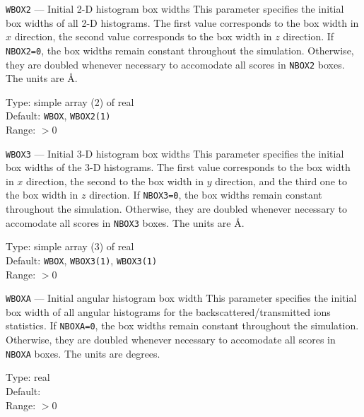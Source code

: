 \begin{keydescription}{\texttt{WBOX2} --- Initial 2-D histogram box widths}
%
  This parameter specifies the initial box widths of all 2-D histograms. The first value 
  corresponds to the box width in $x$ direction, the second value corresponds to the box width 
  in $z$ direction. If \texttt{NBOX2=0}, the box widths remain constant
  throughout the simulation. Otherwise, they are doubled whenever necessary
  to accomodate all scores in \texttt{NBOX2} boxes. The units are \AA.  
  \begin{keytab}
    Type:    \> simple array (2) of real \\
    Default: \> \texttt{WBOX}, \texttt{WBOX2(1)} \\
    Range:   \> $> 0$
  \end{keytab}
\end{keydescription}

\begin{keydescription}{\texttt{WBOX3} --- Initial 3-D histogram box widths}
%
  This parameter specifies the initial box widths of the 3-D histograms. The first value 
  corresponds to the box width in $x$ direction, the second to the box width in $y$ direction, 
  and the third one to the box width in $z$ direction. If \texttt{NBOX3=0}, the
  box widths remain constant throughout the simulation. Otherwise, they are
  doubled whenever necessary to accomodate all scores in \texttt{NBOX3} boxes.
  The units are \AA. 
  \begin{keytab}
    Type:    \> simple array (3) of real \\
    Default: \> \texttt{WBOX}, \texttt{WBOX3(1)}, \texttt{WBOX3(1)} \\
    Range:   \> $> 0$
  \end{keytab}
\end{keydescription}

\begin{keydescription}{\texttt{WBOXA} --- Initial angular histogram box width}
%
  This parameter specifies the initial box width of all angular histograms for the 
  backscattered/transmitted ions statistics. If \texttt{NBOXA=0}, the box
  widths remain constant throughout the simulation. Otherwise, they are doubled
  whenever necessary to accomodate all scores in \texttt{NBOXA} boxes. The
  units are degrees. 
  \begin{keytab}
    Type:    \> real \\
    Default:  \\
    Range:   \> $> 0$
  \end{keytab}
\end{keydescription}

